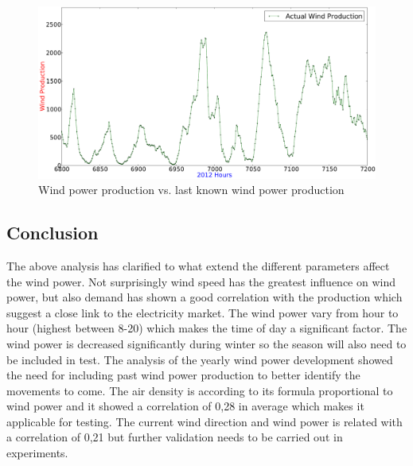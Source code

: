 \begin{figure}[H]
\centering
\includegraphics[width=0.99\linewidth,natwidth=898,natheight=587]{billeder/pointingOutPlaceWhereTrim.png}
\caption{Wind power production vs. last known wind power production}
\label{fig:pointingOutPlaceWhereTrim}
\end{figure}

\subsection{Conclusion}
The above analysis has clarified to what extend the different parameters affect the wind power. Not surprisingly wind speed has the greatest influence on wind power, but also demand has shown a good correlation with the production which suggest a close link to the electricity market. The wind power vary from hour to hour (highest between 8-20) which makes the time of day a significant factor. The wind power is decreased significantly during winter so the season will also need to be included in test. The analysis of the yearly wind power development showed the need for including past wind power production to better identify the movements to come.
The air density is according to its formula proportional to wind power and it showed a correlation of 0,28 in average which makes it applicable for testing. The current wind direction and wind power is related with a correlation of 0,21 but further validation needs to be carried out in experiments.